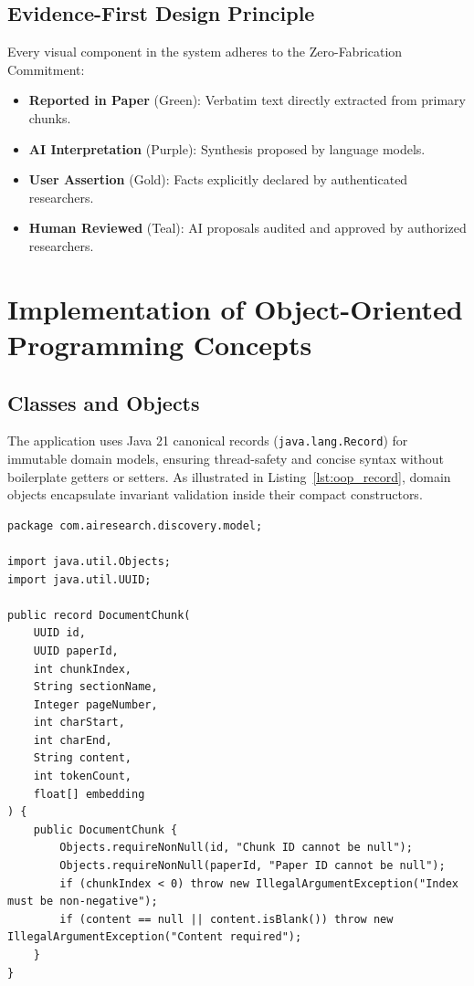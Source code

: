 \documentclass[11pt,a4paper,titlepage]{report}
\begin{document}
\section{Evidence-First Design Principle}
Every visual component in the system adheres to the Zero-Fabrication Commitment:
\begin{itemize}
    \item \textbf{Reported in Paper} (Green): Verbatim text directly extracted from primary chunks.
    \item \textbf{AI Interpretation} (Purple): Synthesis proposed by language models.
    \item \textbf{User Assertion} (Gold): Facts explicitly declared by authenticated researchers.
    \item \textbf{Human Reviewed} (Teal): AI proposals audited and approved by authorized researchers.
\end{itemize}
\chapter{Implementation of Object-Oriented Programming Concepts}

\section{Classes and Objects}
The application uses Java 21 canonical records (\texttt{java.lang.Record}) for immutable domain models, ensuring thread-safety and concise syntax without boilerplate getters or setters. As illustrated in Listing~\ref{lst:oop_record}, domain objects encapsulate invariant validation inside their compact constructors.

\begin{lstlisting}[caption={Immutable DocumentChunk Domain Record with Compact Constructor}, label={lst:oop_record}]
package com.airesearch.discovery.model;

import java.util.Objects;
import java.util.UUID;

public record DocumentChunk(
    UUID id,
    UUID paperId,
    int chunkIndex,
    String sectionName,
    Integer pageNumber,
    int charStart,
    int charEnd,
    String content,
    int tokenCount,
    float[] embedding
) {
    public DocumentChunk {
        Objects.requireNonNull(id, "Chunk ID cannot be null");
        Objects.requireNonNull(paperId, "Paper ID cannot be null");
        if (chunkIndex < 0) throw new IllegalArgumentException("Index must be non-negative");
        if (content == null || content.isBlank()) throw new IllegalArgumentException("Content required");
    }
}
\end{lstlisting}
\end{document}

